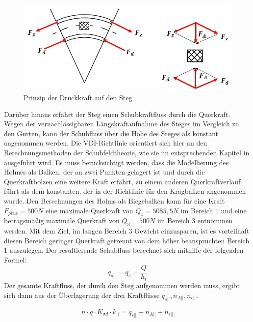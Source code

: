 \begin{figure}[h]
	\includegraphics[width=1.0\textwidth]{Bilder/Abtriebskraft.jpg}
	\caption{Prinzip der Druckkraft auf den Steg}
	\label{fig: Abtriebskraft}
\end{figure}
\noindent Darüber hinaus erfährt der Steg einen Schubkraftfluss durch die Querkraft. Wegen der vernachlässigbaren Längskraftaufnahme des Steges im Vergleich zu den Gurten, kann der Schubfluss über die Höhe des Steges als konstant angenommen werden. Die VDI-Richtlinie orientiert sich hier an den Berechnungsmethoden der Schubfeldtheorie, wie sie im entsprechenden Kapitel in \cite{item15} ausgeführt wird. Es muss berücksichtigt werden, dass die Modellierung des Holmes als Balken, der an zwei Punkten gelagert ist und durch die Querkraftbolzen eine weitere Kraft erfährt, zu einem anderen Querkraftverlauf führt als dem konstanten, der in der Richtlinie für den Kragbalken angenommen wurde. Den Berechnungen des Holms als Biegebalken kann für eine Kraft $ F_{prue}=500N $ eine maximale Querkraft von $ Q_{1}=5085,5N $ im Bereich $ 1 $ und eine betragsmäßig maximale Querkraft von $Q_{3}=500N $ im Bereich $ 3 $ entnommen werden. Mit dem Ziel, im langen Bereich $ 3 $ Gewicht einzusparen, ist es vorteilhaft diesen Bereich geringer Querkraft getrennt von dem höher beanspruchten Bereich $ 1 $ auszulegen. Der resultierende Schubfluss berechnet sich mithilfe der folgenden Formel:\\
\begin{equation}
	q_{s||}=q_{s}=\frac{Q}{h_{i}}
\end{equation}
Der gesamte Kraftfluss, der durch den Steg aufgenommen werden muss, ergibt sich dann aus der Überlagerung der drei Kraftflüsse $q_{s||}, n_{A||}, n_{\epsilon||} $. 

\begin{equation}
	n\cdot \bar{q}\cdot K_{\sigma d}\cdot k_{||}=q_{s||}+n_{A||}+n_{\epsilon||}
\end{equation}

